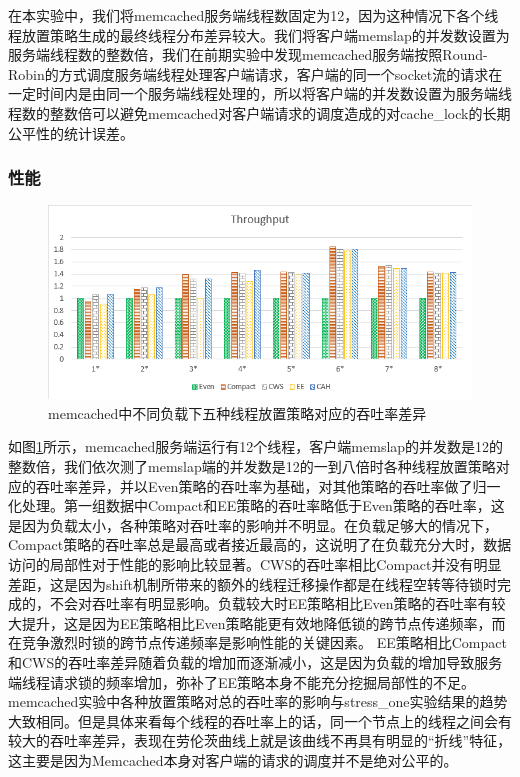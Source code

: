 在本实验中，我们将memcached服务端线程数固定为12，因为这种情况下各个线程放置策略生成的最终线程分布差异较大。我们将客户端memslap的并发数设置为服务端线程数的整数倍，我们在前期实验中发现memcached服务端按照Round-Robin的方式调度服务端线程处理客户端请求，客户端的同一个socket流的请求在一定时间内是由同一个服务端线程处理的，所以将客户端的并发数设置为服务端线程数的整数倍可以避免memcached对客户端请求的调度造成的对cache\_lock的长期公平性的统计误差。
\subsubsection{性能}

\begin{figure}[t]
	\centering
	\includegraphics[width=5.6in]{figure/memcached-throughput.PNG}
	\caption{memcached中不同负载下五种线程放置策略对应的吞吐率差异}
	\label{Fig:memcached-thrpt}
\end{figure}
如图\ref{Fig:memcached-thrpt}所示，memcached服务端运行有12个线程，客户端memslap的并发数是12的整数倍，我们依次测了memslap端的并发数是12的一到八倍时各种线程放置策略对应的吞吐率差异，并以Even策略的吞吐率为基础，对其他策略的吞吐率做了归一化处理。第一组数据中Compact和EE策略的吞吐率略低于Even策略的吞吐率，这是因为负载太小，各种策略对吞吐率的影响并不明显。在负载足够大的情况下，Compact策略的吞吐率总是最高或者接近最高的，这说明了在负载充分大时，数据访问的局部性对于性能的影响比较显著。CWS的吞吐率相比Compact并没有明显差距，这是因为shift机制所带来的额外的线程迁移操作都是在线程空转等待锁时完成的，不会对吞吐率有明显影响。负载较大时EE策略相比Even策略的吞吐率有较大提升，这是因为EE策略相比Even策略能更有效地降低锁的跨节点传递频率，而在竞争激烈时锁的跨节点传递频率是影响性能的关键因素。 EE策略相比Compact和CWS的吞吐率差异随着负载的增加而逐渐减小，这是因为负载的增加导致服务端线程请求锁的频率增加，弥补了EE策略本身不能充分挖掘局部性的不足。memcached实验中各种放置策略对总的吞吐率的影响与stress\_one实验结果的趋势大致相同。但是具体来看每个线程的吞吐率上的话，同一个节点上的线程之间会有较大的吞吐率差异，表现在劳伦茨曲线上就是该曲线不再具有明显的“折线”特征，这主要是因为Memcached本身对客户端的请求的调度并不是绝对公平的。
